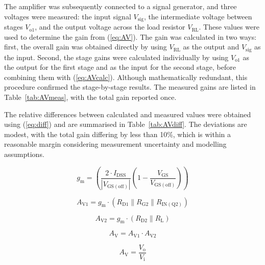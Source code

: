 \documentclass[conference]{IEEEtran}
\newcommand{\Ax}[1]{A_\mathrm{#1}}
\newcommand{\Ix}[1]{I_\mathrm{#1}}
\newcommand{\Rx}[1]{R_\mathrm{#1}}
\newcommand{\Vx}[1]{V_\mathrm{#1}}
\newcommand{\gx}[1]{g_\mathrm{#1}}
\begin{document}
The amplifier was subsequently connected to a signal generator, and three voltages were measured: the input signal \(\Vx{sig}\), the intermediate voltage between stages \(\Vx{o1}\), and the output voltage across the load resistor \(\Vx{RL}\).  
These values were used to determine the gain from (\ref{eq:AV}).  
The gain was calculated in two ways: first, the overall gain was obtained directly by using \(\Vx{RL}\) as the output and \(\Vx{sig}\) as the input.  
Second, the stage gains were calculated individually by using \(\Vx{o1}\) as the output for the first stage and as the input for the second stage, before combining them with (\ref{eq:AVcalc}).  
Although mathematically redundant, this procedure confirmed the stage-by-stage results.  
The measured gains are listed in Table~\ref{tab:AVmeas}, with the total gain reported once.  

The relative differences between calculated and measured values were obtained using (\ref{eq:diff}) and are summarised in Table~\ref{tab:AVdiff}.  
The deviations are modest, with the total gain differing by less than 10\%, which is within a reasonable margin considering measurement uncertainty and modelling assumptions.

\begin{equation}
\label{eq:gm1calc}
    \gx{m} = \left( \frac{2 \cdot \Ix{DSS}} {\left| \Vx{GS(off)} \right|}
    \left( 1 - \frac{\Vx{GS}} {\Vx{GS(off)}} \right) \right)
\end{equation}

\begin{equation}
\label{eq:AV1calc}
    \Ax{V1} = \gx{m} \cdot
    \left( \Rx{D1} \parallel \Rx{G2} \parallel \Rx{IN(Q2)} \right)
\end{equation}

\begin{equation}
\label{eq:AV2calc}
    \Ax{V2} = \gx{m} \cdot
    \left( \Rx{D2} \parallel \Rx{L} \right)
\end{equation}

\begin{equation}
\label{eq:AVcalc}
    \Ax{V} = \Ax{V1} \cdot \Ax{V2}
\end{equation}

\begin{equation}
\label{eq:AV}
    \Ax{V} = \frac{\Vx{o}}{\Vx{i}}
\end{equation}

\vfill
\newpage
\end{document}
